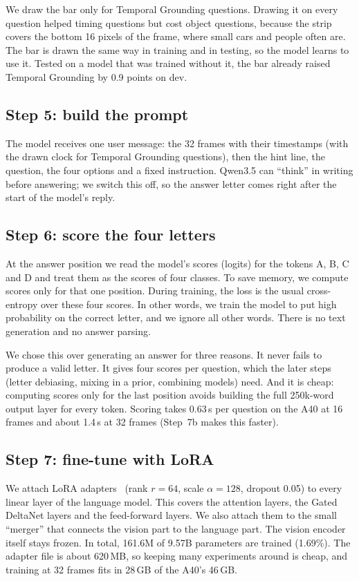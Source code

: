 We draw the bar only for Temporal Grounding questions. Drawing it on every
question helped timing questions but cost object questions, because the
strip covers the bottom 16 pixels of the frame, where small cars and people
often are. The bar is drawn the same way in training and in testing, so the
model learns to use it. Tested on a model that was trained without it, the
bar already raised Temporal Grounding by 0.9 points on dev.

\subsection{Step 5: build the prompt}
The model receives one user message: the 32 frames with their timestamps
(with the drawn clock for Temporal Grounding questions), then the hint line,
the question, the four options and a fixed instruction.
Qwen3.5 can ``think'' in
writing before answering; we switch this off, so the answer letter comes
right after the start of the model's reply.

\subsection{Step 6: score the four letters}
At the answer position we read the model's scores (logits) for the tokens
A, B, C and D and treat them as the scores of four classes. To save memory,
we compute scores only for that one position. During training, the loss is
the usual cross-entropy over these four scores. In other words, we train
the model to put high probability on the correct letter, and we ignore all
other words. There is no text generation and no answer parsing.

We chose this over generating an answer for three reasons. It never fails
to produce a valid letter. It gives four scores per question, which the
later steps (letter debiasing, mixing in a prior, combining models) need.
And it is cheap: computing scores only for the last position avoids
building the full 250k-word output layer for every token. Scoring takes
0.63\,s per question on the A40 at 16 frames and about 1.4\,s at 32 frames
(Step~7b makes this faster).

\subsection{Step 7: fine-tune with LoRA}
We attach LoRA adapters~\cite{hu2022lora} (rank $r{=}64$, scale
$\alpha{=}128$, dropout 0.05) to every linear layer of the language model.
This covers the attention layers, the Gated DeltaNet layers and the
feed-forward layers. We also attach them to the small ``merger'' that
connects the vision part to the language part. The vision encoder itself
stays frozen. In total, 161.6M of 9.57B parameters are trained (1.69\%).
The adapter file is about 620\,MB, so keeping many experiments around is
cheap, and training at 32 frames fits in 28\,GB of the A40's 46\,GB.

